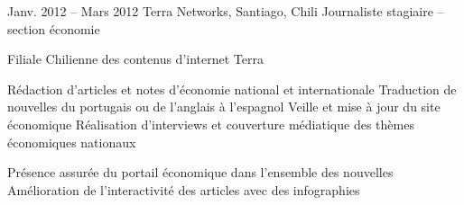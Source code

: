 \documentclass[30pt, french]{tccv}
\begin{document}
\begin{upshape}
\begin{textblock}{13.3}
\begin{mdframed}
\begin{eventlist}
  
\setlength{\parskip}{0pt}
\item{Janv. 2012 -- Mars 2012 }     
  {Terra Networks, Santiago, Chili}     
  {Journaliste stagiaire – section économie}
  \fontsize{9pt}{1em}\color{text}\bodyfontlight\upshape\selectfont

 Filiale Chilienne des contenus d’internet Terra  \\
  
\setlength{\parskip}{-10pt}
\begin{itemize}
      \setlength\itemsep{-3pt} 
      \cvitem[\checkmark] Rédaction d'articles et notes d’économie national et internationale
      \cvitem[\checkmark] Traduction de nouvelles du portugais ou de l'anglais à l'espagnol
      \cvitem[\checkmark] Veille et mise à jour du site économique
      \cvitem[\checkmark] Réalisation d'interviews et couverture médiatique des thèmes économiques nationaux
\end{itemize}        

 Présence assurée du portail économique dans l’ensemble des nouvelles \\
\makebox[1.4cm][l]{}           Amélioration de l’interactivité des articles avec des infographies

   


\end{eventlist}


\end{mdframed}
\end{textblock}

\end{upshape}
\end{document}

